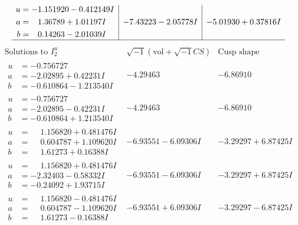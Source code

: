 \documentclass[1p]{elsarticle_modified}
\theoremstyle{definition}
\newcommand{\I}{\sqrt{-1}}
\begin{document}
$$\begin{array}{c|c|c}
\begin{aligned}
u &= -1.151920 - 0.412149 I \\
a &= \phantom{-}1.36789 + 1.01197 I \\
b &= \phantom{-}0.14263 - 2.01039 I\end{aligned}
 & -7.43223 - 2.05778 I & -5.01930 + 0.37816 I\\
 \hline 
 \end{array}$$\newpage$$\begin{array}{c|c|c}  
\text{Solutions to }I^u_{2}& \I (\text{vol} + \sqrt{-1}CS) & \text{Cusp shape}\\
 \hline 
\begin{aligned}
u &= -0.756727\phantom{ +0.000000I} \\
a &= -2.02895 + 0.42231 I \\
b &= -0.610864 - 1.213540 I\end{aligned}
 & -4.29463\phantom{ +0.000000I} & -6.86910\phantom{ +0.000000I} \\ \hline\begin{aligned}
u &= -0.756727\phantom{ +0.000000I} \\
a &= -2.02895 - 0.42231 I \\
b &= -0.610864 + 1.213540 I\end{aligned}
 & -4.29463\phantom{ +0.000000I} & -6.86910\phantom{ +0.000000I} \\ \hline\begin{aligned}
u &= \phantom{-}1.156820 + 0.481476 I \\
a &= \phantom{-}0.604787 + 1.109620 I \\
b &= \phantom{-}1.61273 + 0.16388 I\end{aligned}
 & -6.93551 - 6.09306 I & -3.29297 + 6.87425 I \\ \hline\begin{aligned}
u &= \phantom{-}1.156820 + 0.481476 I \\
a &= -2.32403 - 0.58332 I \\
b &= -0.24092 + 1.93715 I\end{aligned}
 & -6.93551 - 6.09306 I & -3.29297 + 6.87425 I \\ \hline\begin{aligned}
u &= \phantom{-}1.156820 - 0.481476 I \\
a &= \phantom{-}0.604787 - 1.109620 I \\
b &= \phantom{-}1.61273 - 0.16388 I\end{aligned}
 & -6.93551 + 6.09306 I & -3.29297 - 6.87425 I \\ \hline\begin{aligned}

\end{aligned}
\end{array}$$
\end{document}
